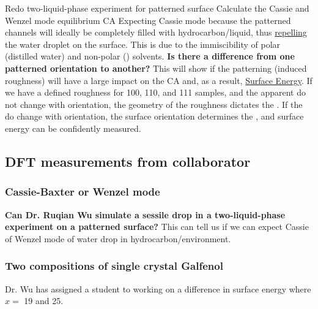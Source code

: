 \begin{outline}[enumerate]
\1 Redo two-liquid-phase experiment for patterned surface
	\2 Calculate the Cassie and Wenzel mode equilibrium CA
		\3 Expecting Cassie mode because the patterned channels will ideally be completely filled with hydrocarbon/\nalk liquid, thus \underline{repelling} the water droplet on the surface. This is due to the immiscibility of polar (distilled water) and non-polar (\nalk) solvents. 
	\2 \textbf{Is there a difference from one patterned orientation to another?} This will show if the patterning (induced roughness) will have a large impact on the CA and, as a result, \underline{Surface Energy}. 
		\3 If we have a defined roughness for {100}, {110}, and {111} samples, and the apparent \ca[s] do not change with orientation, the geometry of the roughness dictates the \ca. 
		\3 If the \ca[s] do change with orientation, the surface orientation determines the \ca, and surface energy can be confidently measured.
\end{outline}


\subsection{DFT measurements from collaborator}
\subsubsection{Cassie-Baxter or Wenzel mode}
\textbf{Can Dr. Ruqian Wu simulate a sessile drop in a two-liquid-phase experiment on a patterned surface?} This can tell us if we can expect Cassie of Wenzel mode of water drop in hydrocarbon/\nalk environment. 

\subsubsection{Two compositions of single crystal Galfenol}
Dr. Wu has assigned a student to working on a difference in \fegacomp surface energy where $x =$ 19 and 25.